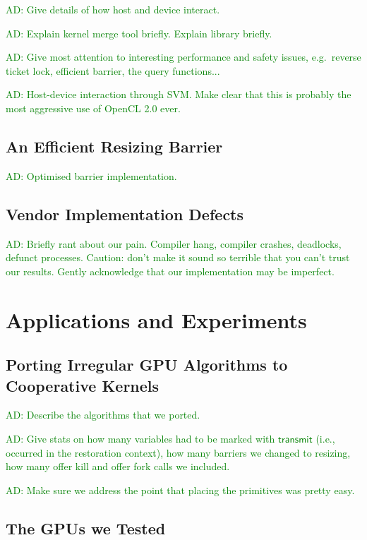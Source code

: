 \documentclass[numbers,nocopyrightspace,10pt]{sigplanconf}
\newcommand{\ADComment}[1]{\textcolor{green}{AD: #1}}
\newcommand{\transmit}{\mathsf{transmit}}
\begin{document}
\ADComment{Give details of how host and device interact.}

\ADComment{Explain kernel merge tool briefly.  Explain library briefly.}

\ADComment{Give most attention to interesting performance and safety issues, e.g.\ reverse ticket lock, efficient barrier, the query functions...}

\ADComment{Host-device interaction through SVM.  Make clear that this is probably the most aggressive use of OpenCL 2.0 ever.}

\subsection{An Efficient Resizing Barrier}\label{sec:resizingbarrier}

\ADComment{Optimised barrier implementation.}

\subsection{Vendor Implementation Defects}

\ADComment{Briefly rant about our pain.  Compiler hang, compiler crashes, deadlocks, defunct processes.  Caution: don't make it sound so terrible that you can't trust our results.  Gently acknowledge that our implementation may be imperfect.}


\section{Applications and Experiments}\label{sec:experiments}

\subsection{Porting Irregular GPU Algorithms to Cooperative Kernels}\label{sec:portingalgorithms}

\ADComment{Describe the algorithms that we ported.}

\ADComment{Give stats on how many variables had to be marked with
  $\transmit$ (i.e., occurred in the restoration context), how many barriers we changed to resizing, how many offer kill and offer fork calls we included.}

\ADComment{Make sure we address the point that placing the primitives was pretty easy.}

\subsection{The GPUs we Tested}
\end{document}
